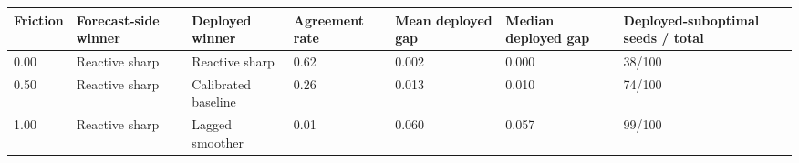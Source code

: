 \begin{tabular}{lllllll}
\toprule
Friction & Forecast-side winner & Deployed winner & Agreement rate & Mean deployed gap & Median deployed gap & Deployed-suboptimal seeds / total \\
\midrule
0.00 & Reactive sharp & Reactive sharp & 0.62 & 0.002 & 0.000 & 38/100 \\
0.50 & Reactive sharp & Calibrated baseline & 0.26 & 0.013 & 0.010 & 74/100 \\
1.00 & Reactive sharp & Lagged smoother & 0.01 & 0.060 & 0.057 & 99/100 \\
\bottomrule
\end{tabular}
